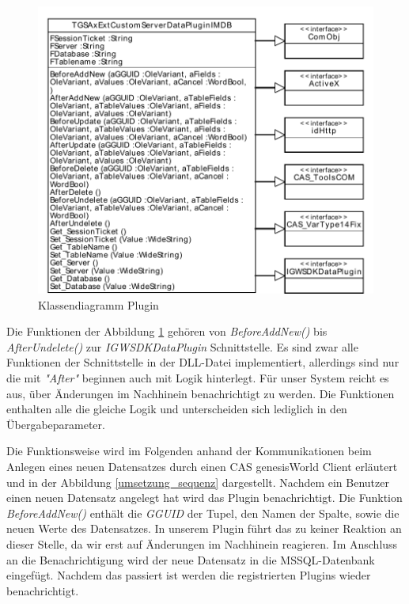\begin{figure}[htbp]
\centering
\includegraphics[scale=0.7]{pics/plugin_klassendiagramm.pdf}
\caption{Klassendiagramm Plugin}
\label{ergebniss_plugin_klassendiagramm}
\end{figure}

Die Funktionen der Abbildung \ref{ergebniss_plugin_klassendiagramm} gehören von \textit{BeforeAddNew()} bis \textit{AfterUndelete()} zur \textit{IGWSDKDataPlugin} Schnittstelle. Es sind zwar alle Funktionen der Schnittstelle in der DLL-Datei implementiert, allerdings sind nur die mit \textit{"After"} beginnen auch mit Logik hinterlegt. Für unser System reicht es aus, über Änderungen im Nachhinein benachrichtigt zu werden. Die Funktionen enthalten alle die gleiche Logik und unterscheiden sich lediglich in den Übergabeparameter.

Die Funktionsweise wird im Folgenden anhand der Kommunikationen beim Anlegen eines neuen Datensatzes durch einen CAS genesisWorld Client erläutert und in der Abbildung \ref{umsetzung_sequenz} dargestellt. Nachdem ein Benutzer einen neuen Datensatz angelegt hat wird das Plugin benachrichtigt. Die Funktion \textit{BeforeAddNew()} enthält die \textit{GGUID} der Tupel, den Namen der Spalte, sowie die neuen Werte des Datensatzes. In unserem Plugin führt das zu keiner Reaktion an dieser Stelle, da wir erst auf Änderungen im Nachhinein reagieren. Im Anschluss an die Benachrichtigung wird der neue Datensatz in die MSSQL-Datenbank eingefügt. Nachdem das passiert ist werden die registrierten Plugins wieder benachrichtigt.

